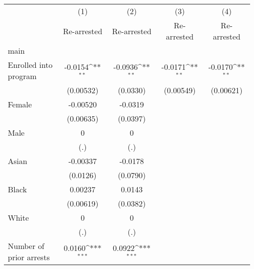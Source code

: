 {
\def\sym#1{\ifmmode^{#1}\else\(^{#1}\)\fi}
\begin{tabular}{l*{4}{c}}
\toprule
                    &\multicolumn{1}{c}{(1)}&\multicolumn{1}{c}{(2)}&\multicolumn{1}{c}{(3)}&\multicolumn{1}{c}{(4)}\\
                    &\multicolumn{1}{c}{Re-arrested}&\multicolumn{1}{c}{Re-arrested}&\multicolumn{1}{c}{Re-arrested}&\multicolumn{1}{c}{Re-arrested}\\
\midrule
main                &                     &                     &                     &                     \\
Enrolled into program&     -0.0154\sym{**} &     -0.0936\sym{**} &     -0.0171\sym{**} &     -0.0170\sym{**} \\
                    &   (0.00532)         &    (0.0330)         &   (0.00549)         &   (0.00621)         \\
\addlinespace
Female              &    -0.00520         &     -0.0319         &                     &                     \\
                    &   (0.00635)         &    (0.0397)         &                     &                     \\
\addlinespace
Male                &           0         &           0         &                     &                     \\
                    &         (.)         &         (.)         &                     &                     \\
\addlinespace
Asian               &    -0.00337         &     -0.0178         &                     &                     \\
                    &    (0.0126)         &    (0.0790)         &                     &                     \\
\addlinespace
Black               &     0.00237         &      0.0143         &                     &                     \\
                    &   (0.00619)         &    (0.0382)         &                     &                     \\
\addlinespace
White               &           0         &           0         &                     &                     \\
                    &         (.)         &         (.)         &                     &                     \\
\addlinespace
Number of prior arrests&      0.0160\sym{***}&      0.0922\sym{***}&                     &                     \\

\end{tabular}}
